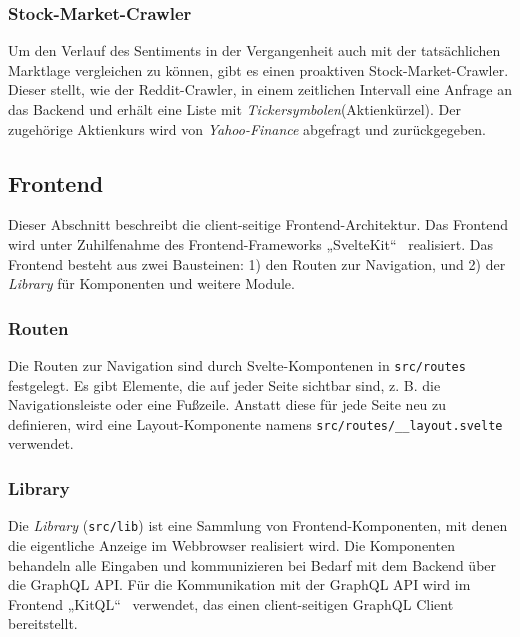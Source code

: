 \documentclass[a4paper, 10pt, conference]{IEEEtran}
\begin{document}
\subsubsection{Stock-Market-Crawler}

Um den Verlauf des Sentiments in der Vergangenheit auch mit der tatsächlichen Marktlage vergleichen zu können,
gibt es einen proaktiven Stock-Market-Crawler. Dieser stellt, wie der Reddit-Crawler, in einem zeitlichen Intervall eine Anfrage an das Backend und erhält eine Liste mit  \textit{Tickersymbolen}(Aktienkürzel). Der zugehörige Aktienkurs wird von \textit{Yahoo-Finance} abgefragt und zurückgegeben.

\subsection{Frontend} \label{sub:frontend}
Dieser Abschnitt beschreibt die client-seitige Frontend-Architektur. Das Frontend wird unter Zuhilfenahme des Frontend-Frameworks „SvelteKit“~\cite{sveltekit} realisiert. Das Frontend besteht aus zwei Bausteinen: 1) den Routen zur Navigation, und 2) der \textit{Library} für Komponenten und weitere Module.

\subsubsection{Routen}

Die Routen zur Navigation sind durch Svelte-Kompontenen in \texttt{src/routes} festgelegt. Es gibt Elemente, die auf jeder Seite sichtbar sind, z. B. die Navigationsleiste oder eine Fußzeile. Anstatt diese für jede Seite neu zu definieren,  wird eine Layout-Komponente namens \texttt{src/routes/\_\_layout.svelte} verwendet.

\subsubsection{Library}

Die \textit{Library} (\texttt{src/lib}) ist eine Sammlung von Frontend-Komponenten,  mit denen die eigentliche Anzeige im Webbrowser realisiert wird. Die Komponenten behandeln alle Eingaben und kommunizieren bei Bedarf mit dem Backend über die GraphQL API. Für die Kommunikation mit der GraphQL API wird im Frontend „KitQL“~\cite{kitql} verwendet, das einen client-seitigen GraphQL Client bereitstellt.
\end{document}
